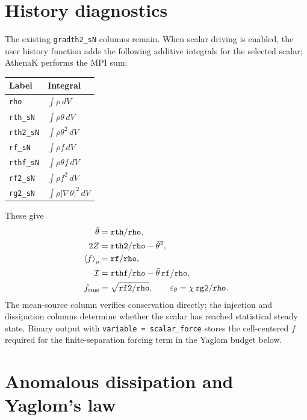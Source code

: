 \documentclass[10pt]{article}
\newcommand{\avg}[1]{\left\langle #1\right\rangle_\rho}
\begin{document}
\section{History diagnostics}

The existing \texttt{gradth2\_sN} columns remain.  When scalar driving is
enabled, the user history function adds the following additive integrals for
the selected scalar; AthenaK performs the MPI sum:
\begin{center}
\begin{tabular}{ll}
\toprule
Label & Integral \\
\midrule
\texttt{rho}     & $\int\rho\,dV$ \\
\texttt{rth\_sN} & $\int\rho\theta\,dV$ \\
\texttt{rth2\_sN}& $\int\rho\theta^2\,dV$ \\
\texttt{rf\_sN}  & $\int\rho f\,dV$ \\
\texttt{rthf\_sN}& $\int\rho\theta f\,dV$ \\
\texttt{rf2\_sN} & $\int\rho f^2\,dV$ \\
\texttt{rg2\_sN} & $\int\rho|\nabla\theta|^2\,dV$ \\
\bottomrule
\end{tabular}
\end{center}
These give
\begin{align}
 \bar{\theta} &= \texttt{rth}/\texttt{rho},\\
 2Z &= \texttt{rth2}/\texttt{rho}-\bar{\theta}^2,\\
 \avg{f} &= \texttt{rf}/\texttt{rho},\\
 \mathcal I &= \texttt{rthf}/\texttt{rho}
                -\bar{\theta}\,\texttt{rf}/\texttt{rho},\\
 f_{\rm rms} &= \sqrt{\texttt{rf2}/\texttt{rho}},\qquad
 \varepsilon_\theta = \chi\,\texttt{rg2}/\texttt{rho}.
\end{align}
The mean-source column verifies conservation directly; the injection and
dissipation columns determine whether the scalar has reached statistical
steady state.  Binary output with
\texttt{variable = scalar\_force} stores the cell-centered $f$ required for
the finite-separation forcing term in the Yaglom budget below.

\section{Anomalous dissipation and Yaglom's law}
\end{document}
